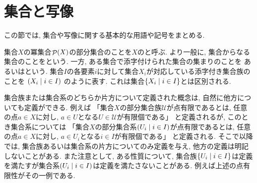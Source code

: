\documentclass[uplatex, dvipdfmx, a4paper, 12pt, class=jsbook, crop=false]{standalone}
\begin{document}
\section{集合と写像}
\label{sec:sets-and-maps}

この節では, 集合や写像に関する基本的な用語や記号をまとめる.

集合$X$の冪集合$\mathop{\mathcal{P}}\nolimits(X)$の部分集合のことを$X$のと呼ぶ.
より一般に, 集合からなる集合のことをという.
一方, ある集合で添字付けられた集合の集まりのことを
あるいはという.
集合$I$の各要素$i$に対して集合$X_i$が対応している添字付き集合族のことを
\(\setfamily{X_i}{i \in I}\)
のように表す.
これは集合$\setcomp{X_i}{i \in I}$とは区別される.

集合族または集合系のどちらか片方について定義された概念は,
自然に他方についても定義ができる.
例えば
「集合$X$の部分集合族$\mathscr{U}$が点有限であるとは, 任意の点$a \in X$に対し, $a \in U$となる$U \in \mathscr{U}$が有限個である」
と定義されるが, このとき集合系については
「集合$X$の部分集合系$\setfamily{U_i}{i \in I}$が点有限であるとは, 任意の点$a \in X$に対し, $a \in U_i$となる$i \in I$が有限個である」
と定義される.
そこで以降では, 集合族あるいは集合系の片方についてのみ定義を与え, 他方の定義は明記しないことがある.
また注意として, ある性質について, 集合族$\setcomp{U_i}{i \in I}$は定義を満たすが集合系$\setfamily{U_i}{i \in I}$は定義を満たさないことがある.
例えば上述の点有限性がその一例である.
\end{document}
